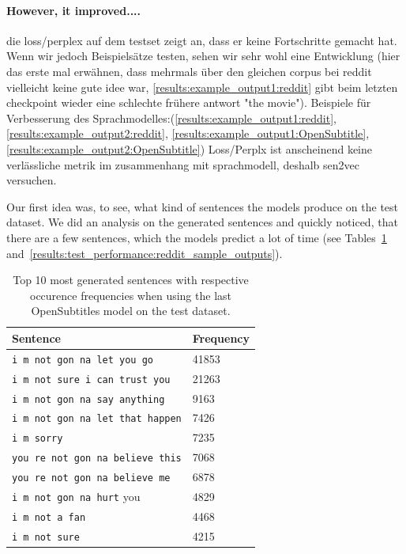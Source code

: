 \paragraph{However, it improved....} die loss/perplex auf dem testset zeigt an, dass er keine Fortschritte gemacht hat. Wenn wir jedoch Beispielsätze testen, sehen wir sehr wohl eine Entwicklung (hier das erste mal erwähnen, dass mehrmals über den gleichen corpus bei reddit vielleicht keine gute idee war, \ref{results:example_output1:reddit} gibt beim letzten checkpoint wieder eine schlechte frühere antwort "the movie"). Beispiele für Verbesserung des Sprachmodelles:(\ref{results:example_output1:reddit}, \ref{results:example_output2:reddit}, \ref{results:example_output1:OpenSubtitle}, \ref{results:example_output2:OpenSubtitle}) Loss/Perplx ist anscheinend keine verlässliche metrik im zusammenhang mit sprachmodell, deshalb sen2vec versuchen.


Our first idea was, to see, what kind of sentences the models produce on the test dataset. We did an analysis on the generated sentences and quickly noticed, that there are a few sentences, which the models predict a lot of time (see Tables~\ref{results:test_performance:opensubtitles_sample_outputs} and~\ref{results:test_performance:reddit_sample_outputs}).



\begin{table}[H]
	\centering
	\begin{adjustbox}{max width=\textwidth}
		\begin{tabular}{ll}
			\toprule
			Sentence & Frequency\\ \midrule
			\texttt{i m not gon na let you go} & 41853\\
			\texttt{i m not sure i can trust you} & 21263\\
			\texttt{i m not gon na say anything} & 9163\\
			\texttt{i m not gon na let that happen} & 7426\\
			\texttt{i m sorry} & 7235\\
			\texttt{you re not gon na believe this} & 7068\\
			\texttt{you re not gon na believe me} & 6878\\
			\texttt{i m not gon na hurt} you & 4829\\
			\texttt{i m not a fan} & 4468\\
			\texttt{i m not sure} & 4215\\
			\bottomrule
		\end{tabular}
	\end{adjustbox}
	\caption{Top 10 most generated sentences with respective occurence frequencies when using the last OpenSubtitles model on the test dataset.}
	\label{results:test_performance:opensubtitles_sample_outputs}
\end{table}

